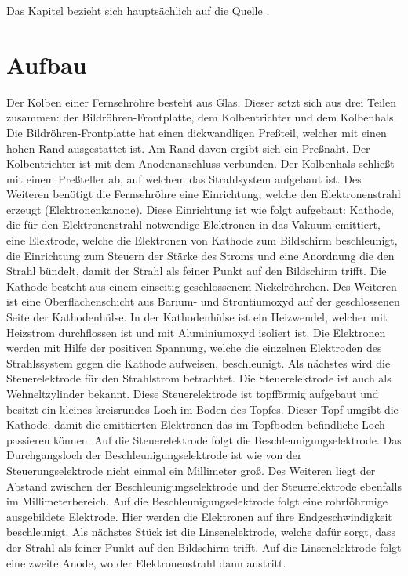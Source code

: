 Das Kapitel bezieht sich hauptsächlich auf die Quelle \cite{Fernsehroehre}.
\section{Aufbau}
Der Kolben einer Fernsehröhre besteht aus Glas.
Dieser setzt sich aus drei Teilen zusammen: der Bildröhren-Frontplatte, dem Kolbentrichter und dem Kolbenhals.
Die Bildröhren-Frontplatte hat einen dickwandligen Preßteil, welcher mit einen hohen Rand ausgestattet ist.
Am Rand davon ergibt sich ein Preßnaht.
Der Kolbentrichter ist mit dem Anodenanschluss verbunden.
Der Kolbenhals schließt mit einem Preßteller ab, auf welchem das Strahlsystem aufgebaut ist.
Des Weiteren benötigt die Fernsehröhre eine Einrichtung, welche den Elektronenstrahl erzeugt (Elektronenkanone).
Diese Einrichtung ist wie folgt aufgebaut: Kathode, die für den Elektronenstrahl notwendige Elektronen in das Vakuum emittiert, eine Elektrode, welche die Elektronen von Kathode zum Bildschirm beschleunigt, die Einrichtung zum Steuern der Stärke des Stroms und eine Anordnung die den Strahl bündelt, damit der Strahl als feiner Punkt auf den Bildschirm trifft. 
Die Kathode besteht aus einem einseitig geschlossenem Nickelröhrchen.
Des Weiteren ist eine Oberflächenschicht aus Barium- und Strontiumoxyd auf der geschlossenen Seite der Kathodenhülse.
In der Kathodenhülse ist ein Heizwendel, welcher mit Heizstrom durchflossen ist und mit Aluminiumoxyd isoliert ist.
Die Elektronen werden mit Hilfe der positiven Spannung, welche die einzelnen Elektroden des Strahlssystem gegen die Kathode aufweisen, beschleunigt.
Als nächstes wird die Steuerelektrode für den Strahlstrom betrachtet.
Die Steuerelektrode ist auch als Wehneltzylinder bekannt.
Diese Steuerelektrode ist topfförmig aufgebaut und besitzt ein kleines kreisrundes Loch im Boden des Topfes.
Dieser Topf umgibt die Kathode, damit die emittierten Elektronen das im Topfboden befindliche Loch passieren können.
Auf die Steuerelektrode folgt die Beschleunigungselektrode.
Das Durchgangsloch der Beschleunigungselektrode ist wie von der Steuerungselektrode nicht einmal ein Millimeter groß.
Des Weiteren liegt der Abstand zwischen der Beschleunigungselektrode und der Steuerelektrode ebenfalls im Millimeterbereich.
Auf die Beschleunigungselektrode folgt eine rohrföhrmige ausgebildete Elektrode.
Hier werden die Elektronen auf ihre Endgeschwindigkeit beschleunigt.
Als nächstes Stück ist die Linsenelektrode, welche dafür sorgt, dass der Strahl als feiner Punkt auf den Bildschirm trifft.
Auf die Linsenelektrode folgt eine zweite Anode, wo der Elektronenstrahl dann austritt.
